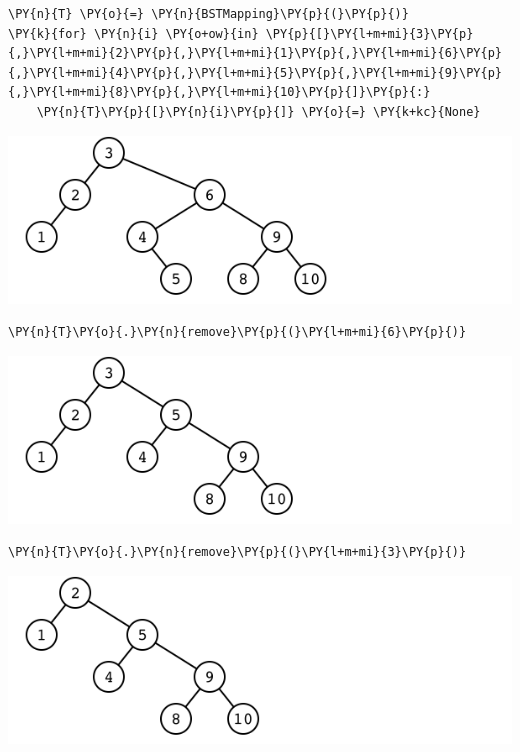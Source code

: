 \begin{Verbatim}[commandchars=\\\{\}]
\PY{n}{T} \PY{o}{=} \PY{n}{BSTMapping}\PY{p}{(}\PY{p}{)}
\PY{k}{for} \PY{n}{i} \PY{o+ow}{in} \PY{p}{[}\PY{l+m+mi}{3}\PY{p}{,}\PY{l+m+mi}{2}\PY{p}{,}\PY{l+m+mi}{1}\PY{p}{,}\PY{l+m+mi}{6}\PY{p}{,}\PY{l+m+mi}{4}\PY{p}{,}\PY{l+m+mi}{5}\PY{p}{,}\PY{l+m+mi}{9}\PY{p}{,}\PY{l+m+mi}{8}\PY{p}{,}\PY{l+m+mi}{10}\PY{p}{]}\PY{p}{:}
    \PY{n}{T}\PY{p}{[}\PY{n}{i}\PY{p}{]} \PY{o}{=} \PY{k+kc}{None}
\end{Verbatim}



\includegraphics[width=\textwidth]{./figures/bstremoval_example1.png}

\begin{Verbatim}[commandchars=\\\{\}]
\PY{n}{T}\PY{o}{.}\PY{n}{remove}\PY{p}{(}\PY{l+m+mi}{6}\PY{p}{)}
\end{Verbatim}



\includegraphics[width=\textwidth]{./figures/bstremoval_example2.png}

\begin{Verbatim}[commandchars=\\\{\}]
\PY{n}{T}\PY{o}{.}\PY{n}{remove}\PY{p}{(}\PY{l+m+mi}{3}\PY{p}{)}
\end{Verbatim}



\includegraphics[width=\textwidth]{./figures/bstremoval_example3.png}
